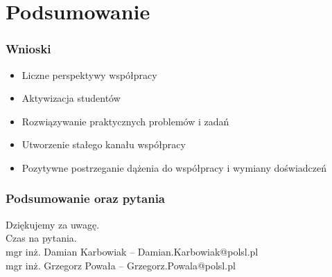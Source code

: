 \documentclass[ucs]{beamer}
\begin{document}
\section{Podsumowanie}
\begin{frame}
\frametitle{Wnioski}
\begin{itemize}
\setlength{\itemsep}{5pt}
\setlength{\parskip}{5pt}
\setlength{\parsep}{5pt}
\item Liczne perspektywy współpracy
\item Aktywizacja studentów
\item Rozwiązywanie praktycznych problemów i zadań
\item Utworzenie stałego kanału współpracy 
\item Pozytywne postrzeganie dążenia do współpracy i wymiany doświadczeń
\end{itemize}
\end{frame}

\begin{frame}
\frametitle{Podsumowanie oraz pytania}
Dziękujemy za uwagę.
\\\vspace{2cm}
Czas na pytania.
\\\vspace{2cm}
mgr inż. Damian Karbowiak -- Damian.Karbowiak@polsl.pl\\
mgr inż. Grzegorz Powała -- Grzegorz.Powala@polsl.pl
\end{frame}
\end{document}
